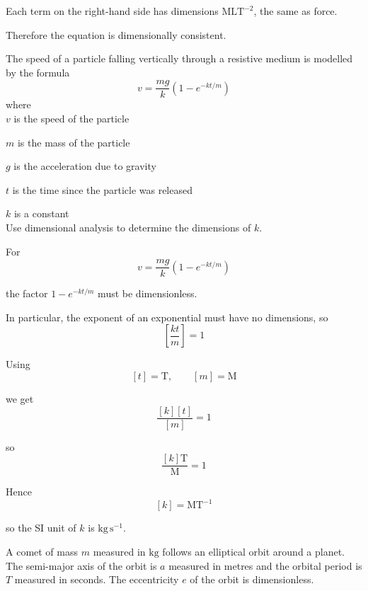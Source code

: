 \documentclass[leqno]{article}
\begin{document}
\begin{enumerate}[
  label=\textbf{\arabic*.},
  leftmargin=*,
  topsep=0pt,
  partopsep=0pt,
  parsep=0pt
]
\begin{djsSolution}
Each term on the right-hand side has dimensions \(\mathrm{MLT^{-2}}\), the same as force.

Therefore the equation is dimensionally consistent.
\end{djsSolution}


\newpage

\questionitem

The speed of a particle falling vertically through a resistive medium is modelled by the formula
\[
v=\dfrac{mg}{k}\left(1-e^{-kt/m}\right)
\] 
where \\

$v$ is the speed of the particle

$m$ is the mass of the particle

$g$ is the acceleration due to gravity

$t$ is the time since the particle was released

$k$ is a constant \\

Use dimensional analysis to determine the dimensions of $k$.  \\

\vspace*{10pt}

\begin{djsSolution}
For
\[
v=\frac{mg}{k}\left(1-e^{-kt/m}\right)
\]

the factor \(1-e^{-kt/m}\) must be dimensionless.

In particular, the exponent of an exponential must have no dimensions, so
\[
\left[\frac{kt}{m}\right]=1
\]

Using
\[
[t]=\mathrm{T},\qquad [m]=\mathrm{M}
\]

we get
\[
\frac{[k][t]}{[m]}=1
\]

so
\[
\frac{[k]\mathrm{T}}{\mathrm{M}}=1
\]

Hence
\[
[k]=\mathrm{MT^{-1}}
\]

so the SI unit of \(k\) is \(\mathrm{kg\,s^{-1}}\).
\end{djsSolution}


\newpage

\questionitem

A comet of mass $m$ measured in $\mathrm{kg}$ follows an elliptical orbit around a planet. The semi-major axis of the orbit is $a$ measured in metres and the orbital period is $T$ measured in seconds. The eccentricity $e$ of the orbit is dimensionless. \\


\end{enumerate}
\end{document}
